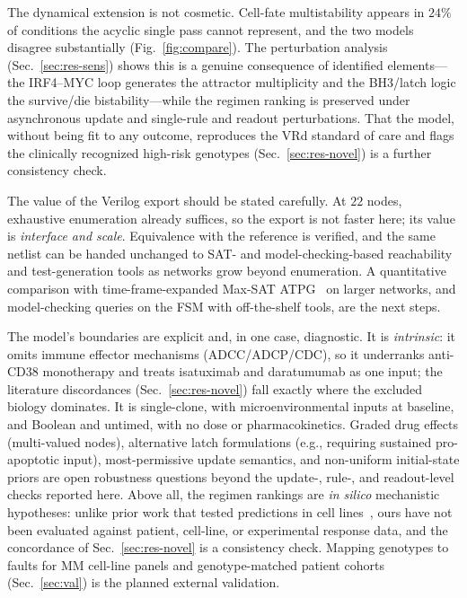 \documentclass[conference,letterpaper]{IEEEtran}
\begin{document}
The dynamical extension is not cosmetic. Cell-fate multistability appears in
$24\%$ of conditions the acyclic single pass cannot represent, and the two models
disagree substantially (Fig.~\ref{fig:compare}). The perturbation analysis
(Sec.~\ref{sec:res-sens}) shows this is a genuine consequence of identified
elements---the IRF4--MYC loop generates the attractor multiplicity and the
BH3/latch logic the survive/die bistability---while the regimen ranking is
preserved under asynchronous update and single-rule and readout perturbations.
That the model, without being fit to any outcome, reproduces the VRd standard of
care and flags the clinically recognized high-risk genotypes
(Sec.~\ref{sec:res-novel}) is a further consistency check.

The value of the Verilog export should be stated carefully. At $22$ nodes,
exhaustive enumeration already suffices, so the export is not faster here; its
value is \emph{interface and scale}. Equivalence with the reference is verified,
and the same netlist can be handed unchanged to SAT- and model-checking-based
reachability~\cite{dubrova} and test-generation tools as networks grow beyond
enumeration. A quantitative comparison with time-frame-expanded Max-SAT
ATPG~\cite{linkhatri} on larger networks, and model-checking queries on the FSM
with off-the-shelf tools, are the next steps.

The model's boundaries are explicit and, in one case, diagnostic. It is
\emph{intrinsic}: it omits immune effector mechanisms (ADCC/ADCP/CDC), so it
underranks anti-CD38 monotherapy and treats isatuximab and daratumumab as one
input; the literature discordances (Sec.~\ref{sec:res-novel}) fall exactly where
the excluded biology dominates. It is single-clone, with microenvironmental
inputs at baseline, and Boolean and untimed, with no dose or pharmacokinetics.
Graded drug effects (multi-valued nodes), alternative latch formulations (e.g.,
requiring sustained pro-apoptotic input), most-permissive update semantics, and
non-uniform initial-state priors are open robustness questions beyond the
update-, rule-, and readout-level checks reported here. Above all, the regimen
rankings are \emph{in silico} mechanistic hypotheses: unlike prior work that
tested predictions in cell lines~\cite{vundavilli}, ours have not been evaluated
against patient, cell-line, or experimental response data, and the concordance of
Sec.~\ref{sec:res-novel} is a consistency check. Mapping genotypes to faults for
MM cell-line panels and genotype-matched patient cohorts (Sec.~\ref{sec:val}) is
the planned external validation.
\end{document}
